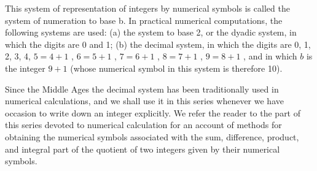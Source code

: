 This system of representation of integers by numerical symbols is called the system of numeration to base b. In practical numerical computations, the following systems are used: (a) the system to base 2, or the dyadic system, in which the digits are 0 and 1; (b) the decimal system, in which the digits are 0, 1, 2, 3, 4, \(5 = 4 + 1\) , \(6 = 5 + 1\) , \(7 = 6 + 1\) , \(8 = 7 + 1\) , \(9 = 8 + 1\) , and in which \(b\) is the integer \(9 + 1\) (whose numerical symbol in this system is therefore 10).

Since the Middle Ages the decimal system has been traditionally used in numerical calculations, and we shall use it in this series whenever we have occasion to write down an integer explicitly. We refer the reader to the part of this series devoted to numerical calculation for an account of methods for obtaining the numerical symbols associated with the sum, difference, product, and integral part of the quotient of two integers given by their numerical symbols.

